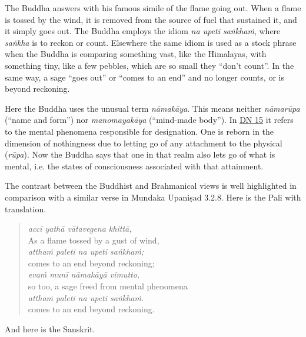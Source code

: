 \documentclass[12pt,openany]{book}%
\begin{document}
The Buddha answers with his famous simile of the flame going out. When a flame is tossed by the wind, it is removed from the source of fuel that sustained it, and it simply goes out. The Buddha employs the idiom \textit{na upeti \textsanskrit{saṅkhaṁ}}, where \textit{\textsanskrit{saṅkha}} is to reckon or count. Elsewhere the same idiom is used as a stock phrase when the Buddha is comparing something vast, like the Himalayas, with something tiny, like a few pebbles, which are so small they “don’t count”. In the same way, a sage “goes out” or “comes to an end” and no longer counts, or is beyond reckoning.

Here the Buddha uses the unusual term \textit{\textsanskrit{nāmakāya}}. This means neither \textit{\textsanskrit{nāmarūpa}} (“name and form”) nor \textit{\textsanskrit{manomayakāya}} (“mind-made body”). In \href{https://suttacentral.net/dn15/en/sujato}{DN 15} it refers to the mental phenomena responsible for designation. One is reborn in the dimension of nothingness due to letting go of any attachment to the physical (\textit{\textsanskrit{rūpa}}). Now the Buddha says that one in that realm also lets go of what is mental, i.e. the states of consciousness associated with that attainment.

The contrast between the Buddhist and Brahmanical views is well highlighted in comparison with a similar verse in Mundaka \textsanskrit{Upaniṣad} 3.2.8. Here is the Pali with translation.

\begin{verse}%
\textit{\textsanskrit{accī} \textsanskrit{yathā} \textsanskrit{vātavegena} \textsanskrit{khittā},} \\
As a flame tossed by a gust of wind, \\
\textit{\textsanskrit{atthaṁ} paleti na upeti \textsanskrit{saṅkhaṁ};} \\
comes to an end beyond reckoning; \\
\textit{\textsanskrit{evaṁ} \textsanskrit{munī} \textsanskrit{nāmakāyā} vimutto,} \\
so too, a sage freed from mental phenomena \\
\textit{\textsanskrit{atthaṁ} paleti na upeti \textsanskrit{saṅkhaṁ}.} \\
comes to an end beyond reckoning.

%
\end{verse}

And here is the Sanskrit.
\end{document}
